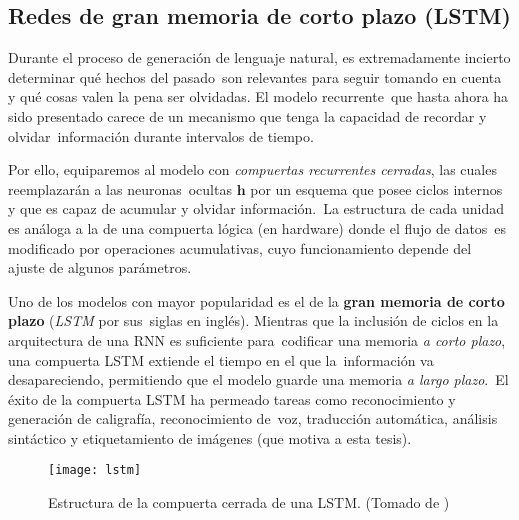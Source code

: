 \subsection{Redes de gran memoria de corto plazo (LSTM)}

Durante el proceso de generación de lenguaje natural, es extremadamente incierto determinar qué hechos del pasado\
son relevantes para seguir tomando en cuenta y qué cosas valen la pena ser olvidadas. El modelo recurrente\
que hasta ahora ha sido presentado carece de un mecanismo que tenga la capacidad de recordar y olvidar\
información durante intervalos de tiempo.\par
Por ello, equiparemos al modelo con \emph{compuertas recurrentes cerradas}, las cuales reemplazarán a las neuronas\
ocultas $\mathbf{h}$ por un esquema que posee ciclos internos y que es capaz de acumular y olvidar información.\
La estructura de cada unidad es análoga a la de una compuerta lógica (en hardware) donde el flujo de datos\
es modificado por operaciones acumulativas, cuyo funcionamiento depende del ajuste de algunos parámetros.\par
Uno de los modelos con mayor popularidad es el de la \textbf{gran memoria de corto plazo} (\emph{LSTM} por sus\
siglas en inglés). Mientras que la inclusión de ciclos en la arquitectura de una RNN es suficiente para\
codificar una memoria \emph{a corto plazo}, una compuerta LSTM extiende el tiempo en el que la\
información va desapareciendo, permitiendo que el modelo guarde una memoria \emph{a largo plazo}.\
El éxito de la compuerta LSTM ha permeado tareas como reconocimiento y generación de caligrafía, reconocimiento de\
voz, traducción automática, análisis sintáctico y etiquetamiento de imágenes (que motiva a esta tesis).

\begin{figure}[h]
  \centering
  \texttt{[image: lstm]}
  \caption{Estructura de la compuerta cerrada de una LSTM.
    (Tomado de \cite{goodfellow-et-al-2016})}
  \label{lstm_fig}
\end{figure}

